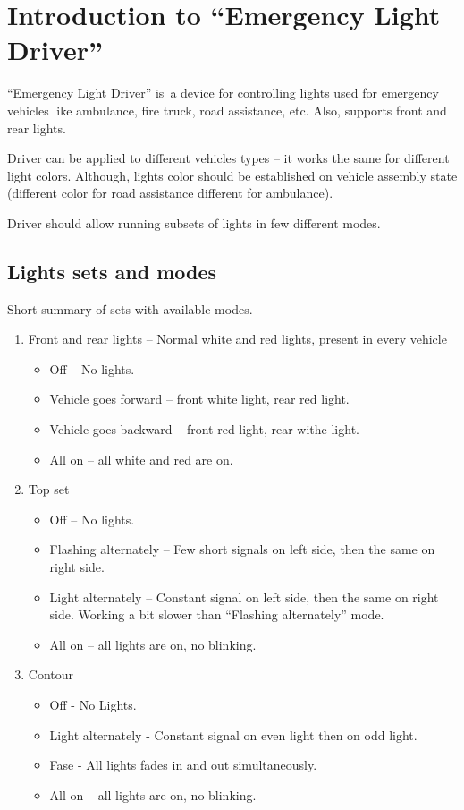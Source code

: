 \section{Introduction to ``Emergency Light Driver''}
``Emergency Light Driver'' is~a device for controlling lights used for emergency vehicles like
ambulance, fire truck, road assistance, etc. Also, supports front and rear lights.

Driver can be applied to different vehicles types -- it works the same for different light colors. Although, lights color should be established on vehicle assembly state (different color for road assistance
different for ambulance).

Driver should allow running subsets of lights in few different modes.

\subsection{Lights sets and modes}
Short summary of sets with available modes.

\begin{enumerate}
	\item Front and rear lights -- Normal white and red lights, present in every vehicle
	\begin{itemize}
		\item Off -- No lights.
		\item Vehicle goes forward -- front white light, rear red light.
		\item Vehicle goes backward -- front red light, rear withe light.
		\item All on -- all white and red are on.
	\end{itemize}
	
	\item Top set
	\begin{itemize}
		\item Off -- No lights.
		\item Flashing alternately -- Few short signals on left side, then the same on right side.
		\item Light alternately -- Constant signal on left side, then the same on right side. Working a bit slower than ``Flashing alternately'' mode.
		\item All on -- all lights are on, no blinking.
	\end{itemize}
		
	\item Contour
	\begin{itemize}
		\item Off - No Lights.
		\item Light alternately - Constant signal on even light then on odd light.
		\item Fase - All lights fades in and out simultaneously.
		\item All on -- all lights are on, no blinking.
	\end{itemize}
\end{enumerate}

